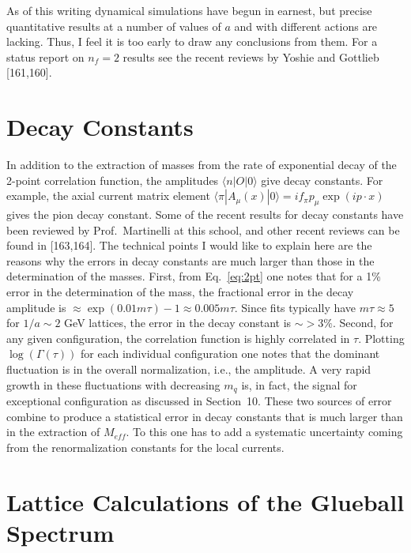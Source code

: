 As of this writing dynamical simulations have begun in earnest, but precise quantitative results at a number of values of $a$ and with different actions are lacking. Thus, I feel it is too early to draw any conclusions from them. For a status report on $n_f = 2$ results see the recent reviews by Yoshie and Gottlieb [161,160].

\section{Decay Constants}

In addition to the extraction of masses from the rate of exponential decay of the 2-point correlation function, the amplitudes $\langle n | O | 0 \rangle$ give decay constants. For example, the axial current matrix element $\langle \pi | A_\mu(x) | 0 \rangle = i f_\pi p_\mu \exp(i p \cdot x)$ gives the pion decay constant. Some of the recent results for decay constants have been reviewed by Prof.\ Martinelli at this school, and other recent reviews can be found in [163,164]. The technical points I would like to explain here are the reasons why the errors in decay constants are much larger than those in the determination of the masses. First, from Eq.~\eqref{eq:2pt} one notes that for a 1\% error in the determination of the mass, the fractional error in the decay amplitude is $\approx \exp(0.01 m \tau) - 1 \approx 0.005 m \tau$. Since fits typically have $m\tau \approx 5$ for $1/a \sim 2$ GeV lattices, the error in the decay constant is $\sim > 3\%$. Second, for any given configuration, the correlation function is highly correlated in $\tau$. Plotting $\log(\Gamma(\tau))$ for each individual configuration one notes that the dominant fluctuation is in the overall normalization, i.e., the amplitude. A very rapid growth in these fluctuations with decreasing $m_q$ is, in fact, the signal for exceptional configuration as discussed in Section~10. These two sources of error combine to produce a statistical error in decay constants that is much larger than in the extraction of $M_{eff}$. To this one has to add a systematic uncertainty coming from the renormalization constants for the local currents.

\section{Lattice Calculations of the Glueball Spectrum}

